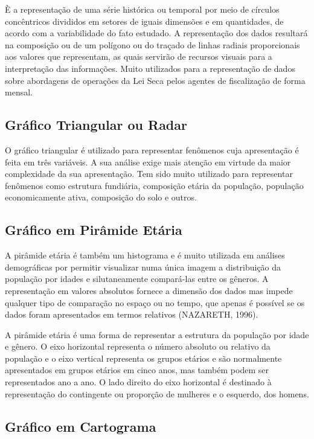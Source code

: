 È a representação de uma série histórica ou temporal por meio de
círculos concêntricos divididos em setores de iguais dimensões e
em quantidades, de acordo com a variabilidade do fato estudado. A
representação dos dados resultará na composição ou de um polígono
ou do traçado de linhas radiais proporcionais aos valores que
representam, as quais servirão de recursos visuais para a
interpretação das informações. Muito utilizados para a
representação de dados sobre abordagens de operações da Lei Seca
pelos agentes de fiscalização de forma mensal.



\newpage
\subsection{Gráfico Triangular ou Radar}

O gráfico triangular é utilizado para representar fenômenos cuja
apresentação é feita em três variáveis. A sua análise exige mais
atenção em virtude da maior complexidade da sua apresentação. Tem
sido muito utilizado para representar fenômenos como estrutura
fundiária, composição etária da população, população
economicamente ativa, composição do solo e outros.


\newpage
\subsection{Gráfico em Pirâmide Etária}

A pirâmide etária é também um histograma e é muito utilizada em  análises demográficas por permitir visualizar numa única imagem a distribuição da população por idades e silutaneamente compará-las entre os gêneros. A representação em valores absolutos fornece a dimensão dos dados mas impede qualquer tipo de comparação no espaço ou no tempo, que apenas é possível se os dados foram apresentados em termos relativos (NAZARETH, 1996). 
\vskip0.3cm

A pirâmide etária é uma forma de representar a estrutura da
população por idade e gênero. O eixo horizontal representa o
número absoluto ou relativo da população e o eixo vertical
representa os grupos etários e são normalmente apresentados em grupos etários em cinco anos, mas também podem ser representados ano a ano. O lado direito do eixo horizontal é destinado à representação do contingente ou proporção de mulheres e o esquerdo, dos homens.


\newpage
\subsection{Gráfico em Cartograma}

